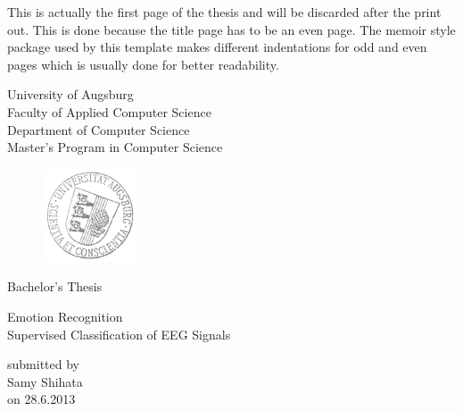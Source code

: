 \documentclass[12pt, a4paper, fleqn]{memoir}%
\begin{document}
\frontmatter

\pagestyle{empty}
This is actually the first page of the thesis and will be discarded after the print out. This is done because 
the title page has to be an even page. The memoir style package used by this template makes different indentations 
for odd and even pages which is usually done for better readability. \cite{wagner2005physiological} 
\clearpage
\pagestyle{empty}
\rmfamily
\noindent
\begin{center}
University of Augsburg\\
Faculty of Applied Computer Science\\
Department of Computer Science\\
Master's Program in Computer Science\\
\end{center}
\begin{figure}[h]
\centering
\includegraphics[width=0.25\textwidth]{logo.png}
\end{figure}
\vfill\vfill
\begin{center}
\Large
Bachelor's Thesis\\
\end{center}
\vspace{2.0em}
\begin{center}
\Large
\LARGE Emotion Recognition\\ \vspace{10pt} 
\Large Supervised Classification of EEG Signals
\end{center}
\vspace{2.0em}
\begin{center}
    \normalsize
    submitted by\\
    \large
    Samy Shihata\\
    \normalsize
    on 28.6.2013
\end{center}
\end{document}
